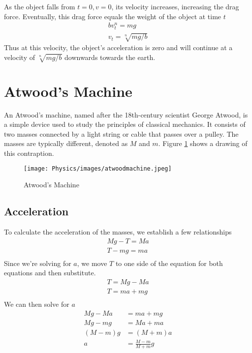 \documentclass[11pt]{article}
\begin{document}
As the object falls from $t = 0, v = 0$, its velocity increases, increasing the drag force. Eventually, this drag force equals the weight of the object at time $t$
\begin{align*}
    bv_t^n = mg \\
    v_t = \sqrt[n]{mg/b}
\end{align*}
Thus at this velocity, the object's acceleration is zero and will continue at a velocity of $\sqrt[n]{mg/b}$ downwards towards the earth.

\section{Atwood's Machine}

An Atwood's machine, named after the 18th-century scientist George Atwood, is a simple device used to study the principles of classical mechanics. It consists of two masses connected by a light string or cable that passes over a pulley. The masses are typically different, denoted as $M$ and $m$. Figure \ref{fig:atwoodmachine} shows a drawing of this contraption.


\begin{figure}[H]
    \centering
    \texttt{[image: Physics/images/atwoodmachine.jpeg]}
    \caption{Atwood's Machine}
    \label{fig:atwoodmachine}
\end{figure}

\subsection{Acceleration}

To calculate the acceleration of the masses, we establish a few relationships
\begin{align*}
    Mg - T = Ma \\
    T - mg = ma \\
\end{align*}
Since we're solving for $a$, we move $T$ to one side of the equation for both equations and then substitute.
\begin{align*}
    T = Mg - Ma \\
    T = ma + mg \\
\end{align*}
We can then solve for $a$
\begin{align*}
    Mg - Ma &= ma + mg \\
    Mg - mg &= Ma + ma \\
    (M - m)g &= (M + m)a \\
    a &= \frac{M - m}{M + m}g
\end{align*}
\end{document}
